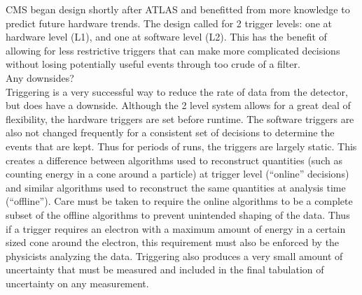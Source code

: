 	CMS began design shortly after ATLAS and benefitted from more knowledge to predict future hardware trends. The design called for 2 trigger levels: one at hardware level (L1), and one at software level (L2). This has the benefit of allowing for less restrictive triggers that can make more complicated decisions without losing potentially useful events through too crude of a filter.\\
	
	Any downsides?\\
	
	Triggering is a very successful way to reduce the rate of data from the detector, but does have a downside. Although the 2 level system allows for a great deal of flexibility, the hardware triggers are set before runtime. The software triggers are also not changed frequently for a consistent set of decisions to determine the events that are kept. Thus for periods of runs, the triggers are largely static. This creates a difference between algorithms used to reconstruct quantities (such as counting energy in a cone around a particle) at trigger level (``online'' decisions) and similar algorithms used to reconstruct the same quantities at analysis time (``offline''). Care must be taken to require the online algorithms to be a complete subset of the offline algorithms to prevent unintended shaping of the data. Thus if a trigger requires an electron with a maximum amount of energy in a certain sized cone around the electron, this requirement must also be enforced by the physicists analyzing the data. Triggering also produces a very small amount of uncertainty that must be measured and included in the final tabulation of uncertainty on any measurement.\\
	